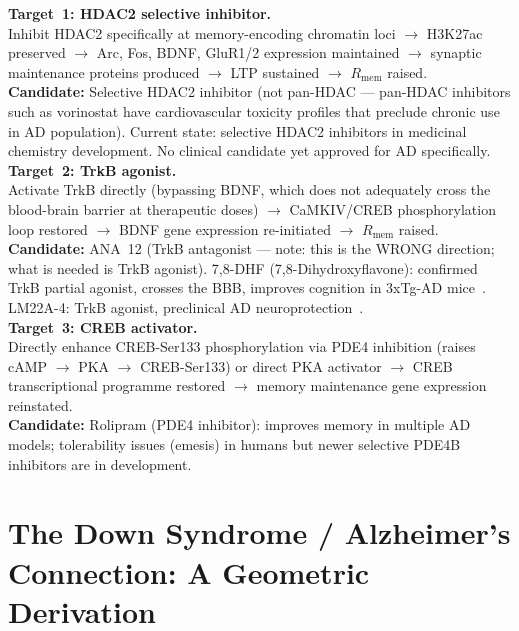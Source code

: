 \documentclass[12pt,a4paper]{article}
\newenvironment{predenv}[1]{%
  \begin{tcolorbox}[colback=blue!4,colframe=headerblue,boxrule=1pt,
    arc=3pt,title={\bfseries\color{white}#1},colbacktitle=headerblue,
    left=8pt,right=8pt,top=6pt,bottom=6pt,breakable]}{%
  \end{tcolorbox}}
\newcommand{\RMEM}{R_{\mathrm{mem}}}
\begin{document}
\begin{predenv}{Drug Targets for Drift Event~2:
Memory Identity Restoration}
\textbf{Target~1: HDAC2 selective inhibitor.}\\
Inhibit HDAC2 specifically at memory-encoding chromatin
loci $\to$ H3K27ac preserved $\to$ Arc, Fos, BDNF,
GluR1/2 expression maintained $\to$ synaptic
maintenance proteins produced $\to$ LTP sustained $\to$
$\RMEM$ raised.\\[6pt]
\textbf{Candidate:} Selective HDAC2 inhibitor (not
pan-HDAC --- pan-HDAC inhibitors such as vorinostat
have cardiovascular toxicity profiles that preclude
chronic use in AD population). Current state: selective
HDAC2 inhibitors in medicinal chemistry development.
No clinical candidate yet approved for AD specifically.
\\[6pt]
\textbf{Target~2: TrkB agonist.}\\
Activate TrkB directly (bypassing BDNF, which does
not adequately cross the blood-brain barrier at
therapeutic doses) $\to$ CaMKIV/CREB phosphorylation
loop restored $\to$ BDNF gene expression re-initiated
$\to$ $\RMEM$ raised.\\[6pt]
\textbf{Candidate:} ANA~12 (TrkB antagonist --- note:
this is the WRONG direction; what is needed is TrkB
agonist). 7,8-DHF (7,8-Dihydroxyflavone): confirmed
TrkB partial agonist, crosses the BBB, improves
cognition in 3xTg-AD mice~\cite{Devi2012}.
LM22A-4: TrkB agonist, preclinical AD
neuroprotection~\cite{Massa2010}.\\[6pt]
\textbf{Target~3: CREB activator.}\\
Directly enhance CREB-Ser133 phosphorylation via
PDE4 inhibition (raises cAMP $\to$ PKA $\to$
CREB-Ser133) or direct PKA activator $\to$ CREB
transcriptional programme restored $\to$ memory
maintenance gene expression reinstated.\\[6pt]
\textbf{Candidate:} Rolipram (PDE4 inhibitor):
improves memory in multiple AD models; tolerability
issues (emesis) in humans but newer selective
PDE4B inhibitors are in development.
\end{predenv}

\section{The Down Syndrome / Alzheimer's Connection:
A Geometric Derivation}
\end{document}
